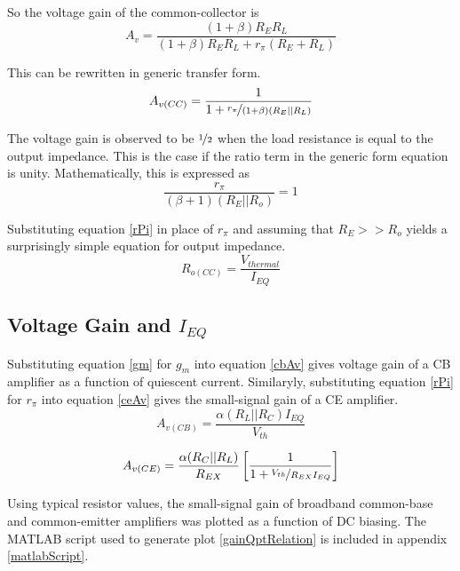 \documentclass[titlepage, letterpaper, 10.5pt]{article}
\begin{document}
So the voltage gain of the common-collector is
\begin{equation*}
A_{v}=\frac{(1+\beta)R_{E}R_{L}}
{(1+\beta)R_{E}R_{L}+r_{\pi}(R_{E}+R_{L})}
\end{equation*}

This can be rewritten in generic transfer form.
\begin{equation}
A_{v(CC)}=\frac{1}{1+\nicefrac{r_{\pi}}{(1+\beta)(R_{E}||R_{L})}}
\label{ccAv}
\end{equation}

The voltage gain is observed to be $\nicefrac{1}{2}$ when the load
resistance is equal to the output impedance. This is the case if the
ratio term in the generic form equation is unity. Mathematically,
this is expressed as
\begin{equation*}
\frac{r_{\pi}}{(\beta+1)(R_{E}||R_{o})}=1
\end{equation*}

Substituting equation \ref{rPi} in place of $r_{\pi}$ and assuming
that $R_{E}>>R_{o}$ yields a surprisingly simple equation for output
impedance.
\begin{equation}
R_{o(CC)}=\frac{V_{thermal}}{I_{EQ}}
\label{ccRo}
\end{equation}

\subsection{Voltage Gain and $I_{EQ}$}
\label{gainVSquiescentCurrent}

Substituting equation \ref{gm} for $g_{m}$ into equation \ref{cbAv}
gives voltage gain of a CB amplifier as a function of quiescent
current. Similaryly, substituting equation \ref{rPi} for $r_{\pi}$
into equation \ref{ceAv} gives the small-signal gain of a CE
amplifier.
\begin{equation}
A_{v(CB)}=\frac{\alpha(R_{L}||R_{C})I_{EQ}}{V_{th}}
\end{equation}

\begin{equation}
A_{v(CE)}=\frac{\alpha(R_{C}||R_{L})}{R_{EX}}
\left[\frac{1}{1+\nicefrac{V_{th}}{R_{EX}I_{EQ}}}\right]
\end{equation}

Using typical resistor values, the small-signal gain of broadband
common-base and common-emitter amplifiers was plotted as a function
of DC biasing. The MATLAB script used to generate plot
\ref{gainQptRelation} is included in appendix \ref{matlabScript}.
\end{document}
